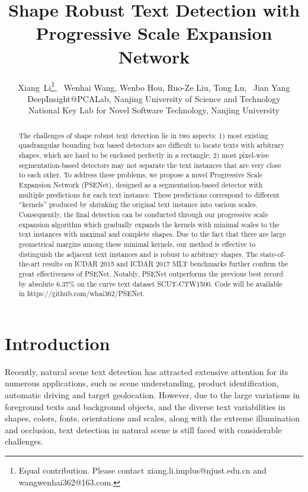 \documentclass{article}
\title{Shape Robust Text Detection with Progressive Scale Expansion Network}
\author{
   Xiang~Li\thanks{Equal contribution. Please contact xiang.li.implus@njust.edu.cn and wangwenhai362@163.com.}, ~Wenhai Wang, Wenbo Hou, Ruo-Ze Liu, Tong Lu, ~Jian Yang\\
   DeepInsight@PCALab, Nanjing University of Science and Technology\\
   National Key Lab for Novel Software Technology, Nanjing University\\
}
\begin{document}
\maketitle

\begin{abstract}
	The challenges of shape robust text detection lie in two aspects: 1) most existing quadrangular bounding box based detectors are difficult to locate texts with arbitrary shapes, which are hard to be enclosed perfectly in a rectangle; 2) most pixel-wise segmentation-based detectors may not separate the text instances that are very close to each other. To address these problems, we propose a novel Progressive Scale Expansion Network (PSENet), designed as a segmentation-based detector with multiple predictions for each text instance. These predictions correspond to different ``kernels'' produced by shrinking the original text instance into various scales. Consequently, the final detection can be conducted through our progressive scale expansion algorithm which gradually expands the kernels with minimal scales to the text instances with maximal and complete shapes. Due to the fact that there are large geometrical margins among these minimal kernels, our method is effective to distinguish the adjacent text instances and is robust to arbitrary shapes. The state-of-the-art results on ICDAR 2015 and ICDAR 2017 MLT benchmarks further confirm the great effectiveness of PSENet. Notably, PSENet outperforms the previous best record by absolute 6.37\% on the curve text dataset SCUT-CTW1500. Code will be available in https://github.com/whai362/PSENet.
\end{abstract}

\section{Introduction}
Recently, natural scene text detection has attracted extensive attention for its numerous applications, such as scene understanding, product identification, automatic driving and target geolocation. However, due to the large variations in foreground texts and background objects, and the diverse text variabilities in shapes, colors, fonts, orientations and scales, along with the extreme illumination and occlusion, text detection in natural scene is still faced with considerable challenges.
\end{document}
